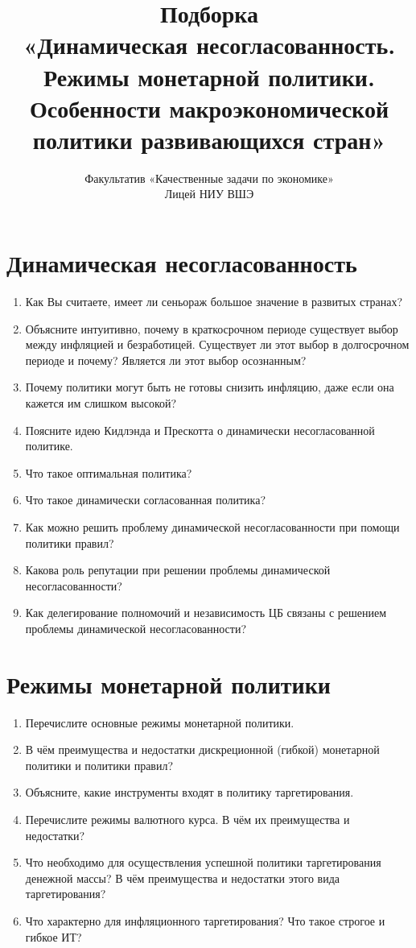 \documentclass[10pt, a4paper]{extarticle}
\title{Подборка \\ «Динамическая несогласованность. Режимы монетарной политики. Особенности макроэкономической политики развивающихся стран»}
\author{Факультатив «Качественные задачи по экономике» \\ Лицей НИУ ВШЭ}
\begin{document}
\maketitle

\section{Динамическая несогласованность}
\begin{enumerate}[label=\alph*)]
	\item Как Вы считаете, имеет ли сеньораж большое значение в развитых странах?
	\item Объясните интуитивно, почему в краткосрочном периоде существует выбор между инфляцией и безработицей. Существует ли этот выбор в долгосрочном периоде и почему? Является ли этот выбор осознанным?
	\item Почему политики могут быть не готовы снизить инфляцию, даже если она кажется им слишком высокой?
	\item Поясните идею Кидлэнда и Прескотта о динамически несогласованной политике.
	\item Что такое оптимальная политика? 
	\item Что такое динамически согласованная политика?
	\item Как можно решить проблему динамической несогласованности при помощи политики правил? 
	\item Какова роль репутации при решении проблемы динамической несогласованности? 
	\item Как делегирование полномочий и независимость ЦБ связаны с решением проблемы динамической несогласованности?
\end{enumerate}

\section{Режимы монетарной политики}
\begin{enumerate}[label=\alph*)]
	\item Перечислите основные режимы монетарной политики.
	\item В чём преимущества и недостатки дискреционной (гибкой) монетарной политики и политики правил?
	\item Объясните, какие инструменты входят в политику таргетирования.
	\item Перечислите режимы валютного курса. В чём их преимущества и недостатки?
	\item Что необходимо для осуществления успешной политики таргетирования денежной массы? В чём преимущества и недостатки этого вида таргетирования?
	\item Что характерно для инфляционного таргетирования? Что такое строгое и гибкое ИТ?
\end{enumerate}
\end{document}
